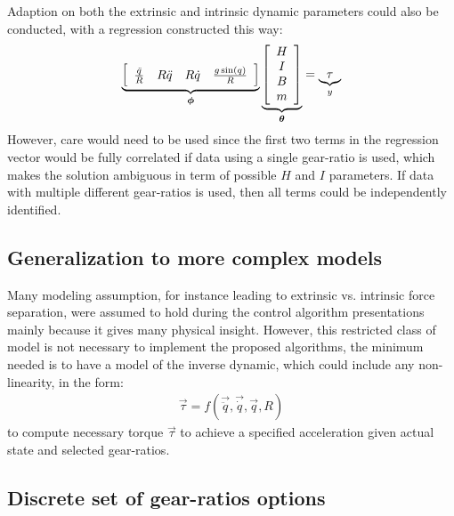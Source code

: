 Adaption on both the extrinsic and intrinsic dynamic parameters could also be conducted, with a regression constructed this way:
%
\begin{align}
	\underbrace{ \left[
	\begin{array}{c c c c}
		\frac{\ddot{q}}{R} &  R\ddot{q} & R \dot{q} & \frac{ g \sin( q ) }{R}
	\end{array} \right] }_{\vec{\phi}}
	\underbrace{ \left[
	\begin{array}{c}
		H \\ I \\ B \\ m
	\end{array} \right] }_{\vec{\theta}}
	 = \underbrace{ \tau }_{y}
\end{align}
%
However, care would need to be used since the first two terms in the regression vector would be fully correlated if data using a single gear-ratio is used, which makes the solution ambiguous in term of possible $H$ and $I$ parameters. If data with multiple different gear-ratios is used, then all terms could be independently identified. 


\subsection{Generalization to more complex models}

Many modeling assumption, for instance leading to extrinsic vs. intrinsic force separation, were assumed to hold during the control algorithm presentations mainly because it gives many physical insight. However, this restricted class of model is not necessary to implement the proposed algorithms, the minimum needed is to have a model of the inverse dynamic, which could include any non-linearity, in the form:
%
\begin{align}
	\vec{\tau}  = f( \vec{\ddot{q}} , \vec{\dot{q}} , \vec{q} , R )
\end{align}
%
to compute necessary torque $\vec{\tau}$ to achieve a specified acceleration given actual state and selected gear-ratios.


\subsection{Discrete set of gear-ratios options}

